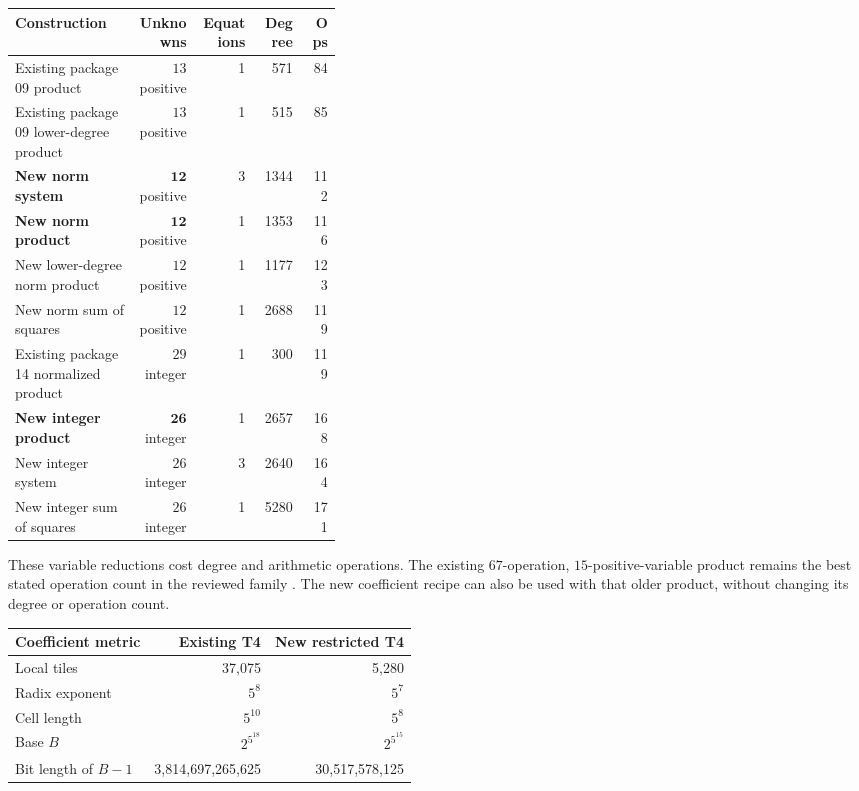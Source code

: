 \documentclass[11pt]{article}
\theoremstyle{remark}\newtheorem{remark}[theorem]{Remark}
\begin{document}
\begin{center}\small
\begin{tabular}{p{0.38\linewidth}rrrr}
\toprule
Construction & Unknowns & Equations & Degree & Ops\\
\midrule
Existing package 09 product & \(13\) positive & 1 & 571 & 84\\
Existing package 09 lower-degree product & \(13\) positive & 1 & 515 & 85\\
\textbf{New norm system} & \(\mathbf{12}\) positive & 3 & 1344 & 112\\
\textbf{New norm product} & \(\mathbf{12}\) positive & 1 & 1353 & 116\\
New lower-degree norm product & \(12\) positive & 1 & 1177 & 123\\
New norm sum of squares & \(12\) positive & 1 & 2688 & 119\\
Existing package 14 normalized product & \(29\) integer & 1 & 300 & 119\\
\textbf{New integer product} & \(\mathbf{26}\) integer & 1 & 2657 & 168\\
New integer system & \(26\) integer & 3 & 2640 & 164\\
New integer sum of squares & \(26\) integer & 1 & 5280 & 171\\
\bottomrule
\end{tabular}
\end{center}

These variable reductions cost degree and arithmetic operations.
The existing \(67\)-operation, \(15\)-positive-variable product remains
the best stated operation count in the reviewed family \cite{repo,blank}. The new
coefficient recipe can also be used with that older product, without
changing its degree or operation count.

\begin{center}\small
\begin{tabular}{lrr}
\toprule
Coefficient metric & Existing T4 & New restricted T4\\
\midrule
Local tiles & 37,075 & 5,280\\
Radix exponent & \(5^8\) & \(5^7\)\\
Cell length & \(5^{10}\) & \(5^8\)\\
Base \(B\) & \(2^{5^{18}}\) & \(2^{5^{15}}\)\\
Bit length of \(B-1\) & 3,814,697,265,625 & 30,517,578,125\\
\bottomrule
\end{tabular}
\end{center}
\end{document}
